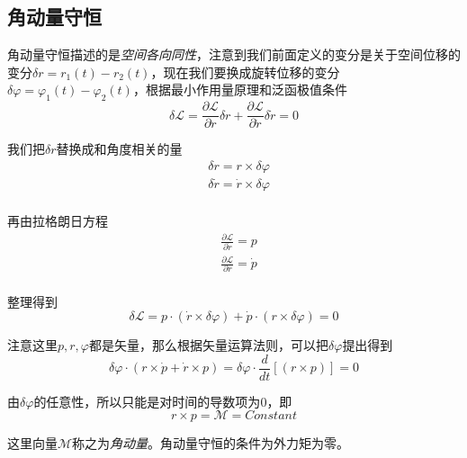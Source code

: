 \subsection*{角动量守恒}

角动量守恒描述的是\textsl{空间各向同性}，注意到我们前面定义的变分是关于空间位移的变分$\delta r=r_1(t)-r_2(t)$，现在我们要换成旋转位移的变分$\delta \varphi=\varphi_1(t)-\varphi_2(t)$，根据最小作用量原理和泛函极值条件
\begin{equation}
    \delta \mathcal{L}=\frac{\partial \mathcal{L}}{\partial r}\delta r+\frac{\partial \mathcal{L}}{\partial \dot{r}}\delta \dot{r}=0
\end{equation}

我们把$\delta r$替换成和角度相关的量
\begin{equation}
    \begin{aligned}
        & \delta r=r\times \delta \varphi\\
        & \delta\dot{r} =\dot{r}\times \delta \varphi\\
    \end{aligned}
\end{equation}

再由拉格朗日方程
\begin{equation}
    \begin{aligned}
        & \frac{\partial \mathcal{L}}{\partial \dot{r}}=p\\
        & \frac{\partial \mathcal{L}}{\partial r}=\dot{p}\\
    \end{aligned}
\end{equation}

整理得到
\begin{equation}
    \delta \mathcal{L}=p\cdot(\dot{r}\times \delta\varphi)+\dot{p}\cdot(r\times \delta \varphi)=0
\end{equation}

注意这里$p,r,\varphi$都是矢量，那么根据矢量运算法则，可以把$\delta\varphi$提出得到
\begin{equation}
    \delta \varphi\cdot(r\times \dot{p}+\dot{r}\times p)=\delta \varphi\cdot\frac{d}{dt}\left[(r\times p)\right]=0
\end{equation}

由$\delta\varphi$的任意性，所以只能是对时间的导数项为$0$，即
\begin{equation}
    r\times p=\mathcal{M}=Constant
\end{equation}

这里向量$\mathcal{M}$称之为\textsl{角动量}。角动量守恒的条件为外力矩为零。



